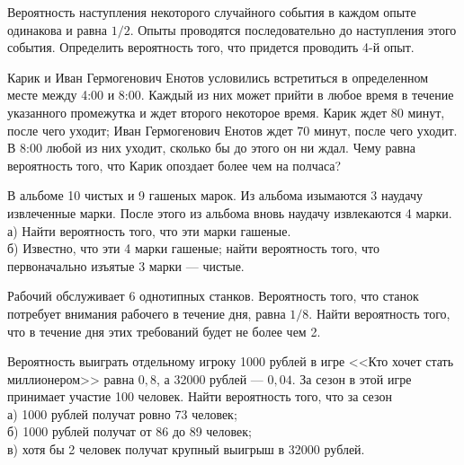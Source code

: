 \newpage\setcounter{zad}{0}



\begin{zkrW}{20}\noindent 
	Вероятность наступления некоторого случайного события в каждом опыте одинакова и равна $1/2$. Опыты проводятся последовательно до наступления этого события. Определить вероятность того, что придется проводить 4-й опыт.
 
\end{zkrW}

\begin{zkrW}{20}\noindent 
	Карик и Иван Гермогенович Енотов условились встретиться в определенном месте между 4:00 и 8:00. Каждый из них может прийти в любое время в течение указанного промежутка и ждет второго некоторое время. Карик ждет 80 минут, после чего уходит; Иван Гермогенович Енотов ждет 70 минут, после чего уходит. В 8:00 любой из них уходит, сколько бы до этого он ни ждал. Чему равна вероятность того, что Карик опоздает более чем на полчаса?
 
\end{zkrW}

\begin{zkrW}{20}\noindent 
	В альбоме 10 чистых и 9 гашеных марок. Из альбома изымаются 3 наудачу извлеченные марки. После этого из альбома вновь наудачу извлекаются 4 марки. \\ \indent а) Найти вероятность того, что эти марки гашеные. \\ \indent б) Известно, что эти 4 марки гашеные; найти вероятность того, что первоначально изъятые 3 марки --- чистые.
 
\end{zkrW}

\begin{zkrW}{20}\noindent 
	Рабочий обслуживает 6 однотипных станков. Вероятность того, что станок потребует внимания рабочего в течение дня, равна $1/8$. Найти вероятность того, что в течение дня этих требований будет не более чем 2.
 
\end{zkrW}

\begin{zkrW}{20}\noindent 
	Вероятность выиграть отдельному игроку 1000 рублей в игре <<Кто хочет стать миллионером>> равна $0{,}8$, а 32000 рублей --- $0{,}04$. За сезон в этой игре принимает участие 100 человек. Найти вероятность того, что за сезон \\ \indent а) 1000 рублей получат ровно 73 человек; \\ \indent б) 1000 рублей получат от 86 до 89 человек; \\ \indent в) хотя бы 2 человек получат крупный выигрыш в 32000 рублей.
 
\end{zkrW}

